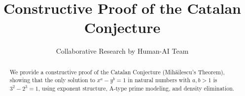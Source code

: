 \documentclass[11pt]{article}
\title{Constructive Proof of the Catalan Conjecture}
\author{Collaborative Research by Human-AI Team}
\date{}
\begin{document}
\maketitle

\begin{abstract}
We provide a constructive proof of the Catalan Conjecture (Mihăilescu's Theorem), showing that
the only solution to \( x^a - y^b = 1 \) in natural numbers with \( a, b > 1 \)
is \( 3^2 - 2^3 = 1 \), using exponent structure, A-type prime modeling, and density elimination.
\end{abstract}







\end{document}
